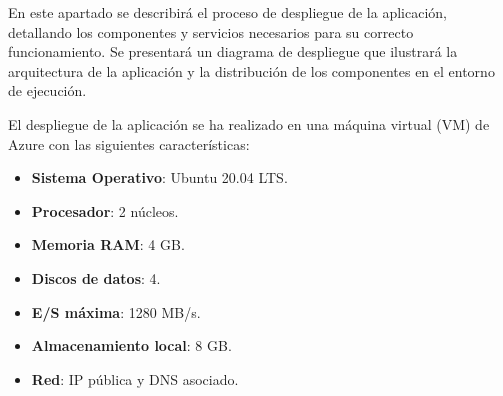 En este apartado se describirá el proceso de despliegue de la aplicación, detallando los componentes y servicios necesarios para su correcto funcionamiento. 
Se presentará un diagrama de despliegue que ilustrará la arquitectura de la aplicación y la distribución de los componentes en el entorno de ejecución. 

El despliegue de la aplicación se ha realizado en una máquina virtual (VM) de Azure con las siguientes características:
\begin{itemize}
    \item \textbf{Sistema Operativo}: Ubuntu 20.04 LTS.
    \item \textbf{Procesador}: 2 núcleos.
    \item \textbf{Memoria RAM}: 4 GB.
    \item \textbf{Discos de datos}: 4.
    \item \textbf{E/S máxima}: 1280 MB/s.
    \item \textbf{Almacenamiento local}: 8 GB.
    \item \textbf{Red}: IP pública y DNS asociado.
\end{itemize}

